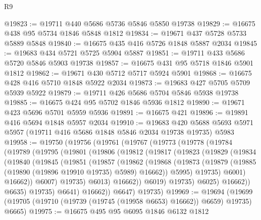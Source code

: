 \begin{lexlean}{R9}
\begin{coremodule}
@19823 := @19711 @440 @5686 @5736 @5846 @5850 @19738
@19829 := @16675 @438 @95 @5734 @1846 @5848 @1812
@19834 := @19671 @437 @5728 @5733 @5889 @5848
@19840 := @16675 @435 @416 @5726 @1848 @5887 @2034
@19845 := @19683 @434 @5721 @5725 @5904 @5887
@19851 := @19711 @433 @5686 @5720 @5846 @5903 @19738
@19857 := @16675 @431 @95 @5718 @1846 @5901 @1812
@19862 := @19671 @430 @5712 @5717 @5924 @5901
@19868 := @16675 @428 @416 @5710 @1848 @5922 @2034
@19873 := @19683 @427 @5705 @5709 @5939 @5922
@19879 := @19711 @426 @5686 @5704 @5846 @5938 @19738
@19885 := @16675 @424 @95 @5702 @1846 @5936 @1812
@19890 := @19671 @423 @5696 @5701 @5959 @5936
@19891 := @16675 @421
@19896 := @19891 @416 @5694 @1848 @5957 @2034
@19910 := @19683
    @420
    @5688
    @5693
    @5971
    @5957
    (@19711 @416 @5686 @1848 @5846 @2034 @19738 @19735)
    @5983
@19958 := @19750
    (@19756
      (@19761
        (@19767
          (@19773
            (@19778
              (@19784
                (@19789
                  (@19795
                    (@19801
                      (@19806
                        (@19812
                          (@19817
                            (@19823
                              (@19829
                                (@19834
                                  (@19840
                                    (@19845
                                      (@19851
                                        (@19857
                                          (@19862
                                            (@19868
                                              (@19873
                                                (@19879
                                                  (@19885
                                                    (@19890 (@19896 @19910 @19735) @5989)
                                                    @16662))
                                                @5995)
                                              @19735)
                                            @6001)
                                          @16662))
                                      @6007)
                                    @19735)
                                  @6013)
                                @16662))
                            @6019)
                          @19735)
                        @6025)
                      @16662))
                  @6635)
                @19735)
              @6641)
            @16662))
        @6647)
      @19735)
@19969 := @19694
    (@19699 (@19705 (@19710 (@19739 (@19745 (@19958 @6653) @16662)) @6659) @19735) @6665)
@19975 := @16675 @495 @95 @6095 @1846 @6132 @1812

\end{coremodule}
\end{lexlean}
